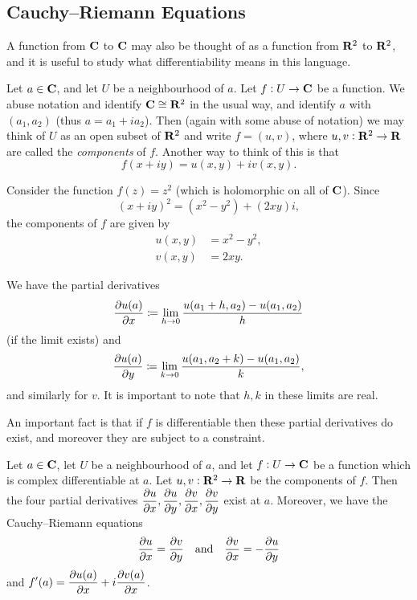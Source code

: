 \subsection{Cauchy--Riemann Equations}
A function from $\mathbf C$ to $\mathbf C$ may also be thought of as a function from $\mathbf R^2$ to $\mathbf R^2$, and it is useful to study what differentiability means in this language.

Let $a\in\mathbf C$, and let $U$ be a neighbourhood of $a$. Let $f:U\to\mathbf C$ be a function. We abuse notation and identify $\mathbf C\cong\mathbf R^2$ in the usual way, and identify $a$ with $(a_1,a_2)$ (thus $a=a_1+ia_2$). Then (again with some abuse of notation) we may think of $U$ as an open subset of $\mathbf R^2$ and write $f=(u,v)$, where $u,v:\mathbf R^2\to\mathbf R$ are called the \emph{components} of $f$. Another way to think of this is that
\[f(x+iy)=u(x,y)+iv(x,y).\]

\begin{example}
Consider the function $f(z)=z^2$ (which is holomorphic on all of $\mathbf C$). Since
\[(x+iy)^2=(x^2-y^2)+(2xy)i,\]
the components of $f$ are given by
\begin{align*}
u(x,y)&=x^2-y^2,\\
v(x,y)&=2xy.
\end{align*}
\end{example}

We have the partial derivatives
\[\pdv{u(a)}{x}\coloneqq\lim_{h\to0}\frac{u(a_1+h,a_2)-u(a_1,a_2)}{h}\]
(if the limit exists) and
\[\pdv{u(a)}{y}\coloneqq\lim_{k\to0}\frac{u(a_1,a_2+k)-u(a_1,a_2)}{k},\]
and similarly for $v$. It is important to note that $h, k$ in these limits are real.

An important fact is that if $f$ is differentiable then these partial derivatives do exist, and moreover they are subject to a constraint.

\begin{theorem}
Let $a\in\mathbf C$, let $U$ be a neighbourhood of $a$, and let $f:U\to\mathbf C$ be a function which is complex differentiable at $a$. Let $u,v:\mathbf R^2\to\mathbf R$ be the components of $f$. Then the four partial derivatives $\displaystyle\pdv{u}{x}, \pdv{u}{y}, \pdv{v}{x}, \pdv{v}{y}$ exist at $a$. Moreover, we have the Cauchy--Riemann equations
\begin{equation}
\pdv{u}{x}=\pdv{v}{y}\quad\text{and}\quad\pdv{v}{x}=-\pdv{u}{y}
\end{equation}
and $\displaystyle f^\prime(a)=\pdv{u(a)}{x}+i\pdv{v(a)}{x}$.
\end{theorem}

